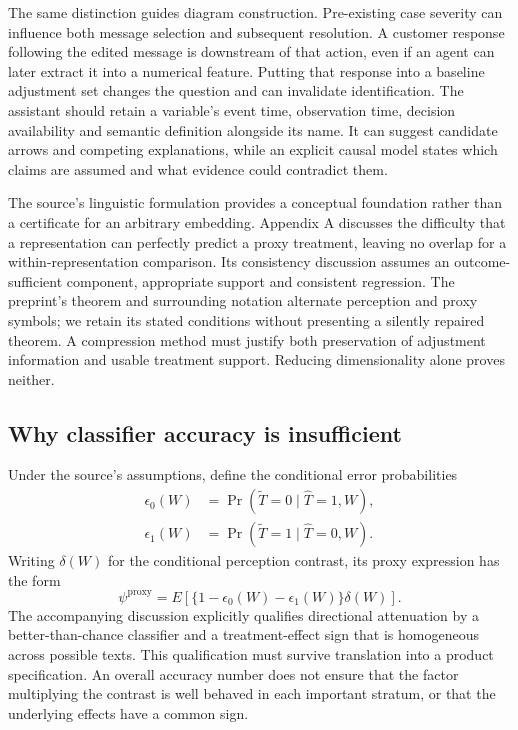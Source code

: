 The same distinction guides diagram construction. Pre-existing case severity can influence both message selection and subsequent resolution. A customer response following the edited message is downstream of that action, even if an agent can later extract it into a numerical feature. Putting that response into a baseline adjustment set changes the question and can invalidate identification. The assistant should retain a variable's event time, observation time, decision availability and semantic definition alongside its name. It can suggest candidate arrows and competing explanations, while an explicit causal model states which claims are assumed and what evidence could contradict them.

The source's linguistic formulation provides a conceptual foundation rather than a certificate for an arbitrary embedding. Appendix A discusses the difficulty that a representation can perfectly predict a proxy treatment, leaving no overlap for a within-representation comparison. Its consistency discussion assumes an outcome-sufficient component, appropriate support and consistent regression. The preprint's theorem and surrounding notation alternate perception and proxy symbols; we retain its stated conditions without presenting a silently repaired theorem. A compression method must justify both preservation of adjustment information and usable treatment support. Reducing dimensionality alone proves neither.\citep{exec28_lm_pryzant}

\subsection{Why classifier accuracy is insufficient}

Under the source's assumptions, define the conditional error probabilities
\begin{align}
 \epsilon_0(W)&=\Pr(\widetilde T=0\mid\widehat T=1,W),\\
 \epsilon_1(W)&=\Pr(\widetilde T=1\mid\widehat T=0,W).
\end{align}
Writing $\delta(W)$ for the conditional perception contrast, its proxy expression has the form
\begin{equation}
 \psi^{\mathrm{proxy}}=E\!\left[\{1-\epsilon_0(W)-\epsilon_1(W)\}\delta(W)\right].
 \label{eq:exec28-lm-proxy}
\end{equation}
The accompanying discussion explicitly qualifies directional attenuation by a better-than-chance classifier and a treatment-effect sign that is homogeneous across possible texts. This qualification must survive translation into a product specification. An overall accuracy number does not ensure that the factor multiplying the contrast is well behaved in each important stratum, or that the underlying effects have a common sign.\citep{exec28_lm_pryzant}

